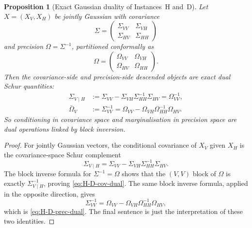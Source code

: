 \documentclass[11pt,a4paper]{article}
\numberwithin{equation}{section}
\theoremstyle{thmcompact}
\newtheorem{proposition}[theorem]{Proposition}
\theoremstyle{remark}
\begin{document}
\begin{proposition}[Exact Gaussian duality of Instances~H and~D]\label{prop:H-D-duality}
Let $X=(X_V,X_H)$ be jointly Gaussian with covariance
\[
\Sigma=\begin{pmatrix}\Sigma_{VV}&\Sigma_{VH}\\ \Sigma_{HV}&\Sigma_{HH}\end{pmatrix}
\]
and precision $\Omega=\Sigma^{-1}$, partitioned conformally as
\[
\Omega=\begin{pmatrix}\Omega_{VV}&\Omega_{VH}\\ \Omega_{HV}&\Omega_{HH}\end{pmatrix}.
\]
Then the covariance-side and precision-side descended objects are exact dual Schur quantities:
\begin{align}
\Sigma_{V\mid H}
&:=\Sigma_{VV}-\Sigma_{VH}\Sigma_{HH}^{-1}\Sigma_{HV}
=\Omega_{VV}^{-1}, \label{eq:H-D-cov-dual}\\
\bar\Omega_V
&:=\Sigma_{VV}^{-1}
=\Omega_{VV}-\Omega_{VH}\Omega_{HH}^{-1}\Omega_{HV}. \label{eq:H-D-prec-dual}
\end{align}
So conditioning in covariance space and marginalisation in precision space are dual operations linked by block inversion.
\end{proposition}

\begin{proof}
For jointly Gaussian vectors, the conditional covariance of $X_V$ given $X_H$ is the covariance-space Schur complement
\[
\Sigma_{V\mid H}=\Sigma_{VV}-\Sigma_{VH}\Sigma_{HH}^{-1}\Sigma_{HV}.
\]
The block inverse formula for $\Sigma^{-1}=\Omega$ shows that the $(V,V)$ block of $\Omega$ is exactly $\Sigma_{V\mid H}^{-1}$, proving \eqref{eq:H-D-cov-dual}. The same block inverse formula, applied in the opposite direction, gives
\[
\Sigma_{VV}^{-1}=\Omega_{VV}-\Omega_{VH}\Omega_{HH}^{-1}\Omega_{HV},
\]
which is \eqref{eq:H-D-prec-dual}. The final sentence is just the interpretation of these two identities.
\end{proof}
\end{document}
